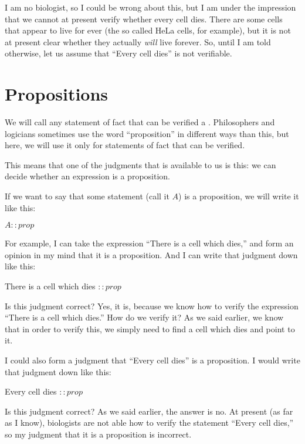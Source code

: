 \documentclass[../../../main.tex]{subfiles}
\begin{document}
I am no biologist, so I could be wrong about this, but I am under the impression that we cannot at present verify whether every cell dies. There are some cells that appear to live for ever (the so called HeLa cells, for example), but it is not at present clear whether they actually \emph{will} live forever. So, until I am told otherwise, let us assume that ``Every cell dies'' is not verifiable.


\section{Propositions}

We will call any statement of fact that can be verified a . Philosophers and logicians sometimes use the word ``proposition'' in different ways than this, but here, we will use it only for statements of fact that can be verified.

This means that one of the judgments that is available to us is this: we can decide whether an expression is a proposition.

If we want to say that some statement (call it $A$) is a proposition, we will write it like this:

\begin{center}
  $A :: prop$
\end{center}

\noindent
For example, I can take the expression ``There is a cell which dies,'' and form an opinion in my mind that it is a proposition. And I can write that judgment down like this:

\begin{center}
  There is a cell which dies $:: prop$
\end{center}

\noindent
Is this judgment correct? Yes, it is, because we know how to verify the expression ``There is a cell which dies.'' How do we verify it? As we said earlier, we know that in order to verify this, we simply need to find a cell which dies and point to it.

I could also form a judgment that ``Every cell dies'' is a proposition. I would write that judgment down like this:

\begin{center}
  Every cell dies $:: prop$
\end{center}

\noindent
Is this judgment correct? As we said earlier, the answer is no. At present (as far as I know), biologists are not able how to verify the statement ``Every cell dies,'' so my judgment that it is a proposition is incorrect.
\end{document}
